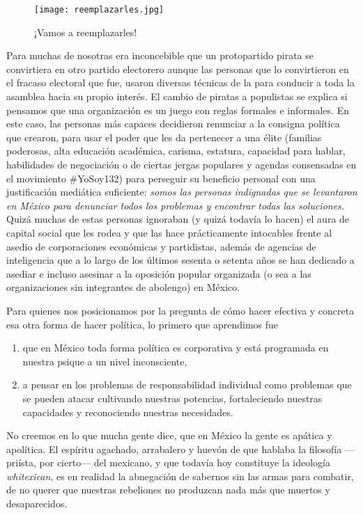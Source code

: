 \begin{figure}[htbp]
	\centering
	\texttt{[image: reemplazarles.jpg]}
	\caption{¡Vamos a reemplazarles!}
	\label{fig:reemplazo}
\end{figure}

Para muchas de nosotras era inconcebible que un protopartido pirata se convirtiera en otro partido electorero aunque las personas que lo convirtieron en el fracaso electoral que fue, usaron diversas técnicas de la  para conducir a toda la asamblea hacia su propio interés. El cambio de piratas a populistas se explica si pensamos que una organización es un juego con reglas formales e informales. En este caso, las personas más capaces decidieron renunciar a la consigna política que crearon, para usar el poder que les da pertenecer a una élite (familias poderosas, alta educación académica, carisma, estatura, capacidad para hablar, habilidades de negociación o de ciertas jergas populares y agendas consensadas en el movimiento \#YoSoy132) para perseguir su beneficio personal con una justificación mediática suficiente: \emph{somos las personas indignadas que se levantaron en México para denunciar todos los problemas y encontrar todas las soluciones.} Quizá muchas de estas personas ignoraban (y quizá todavía lo hacen) el aura de capital social que les rodea y que las hace prácticamente intocables frente al asedio de corporaciones económicas y partidistas, además de agencias de inteligencia que a lo largo de los últimos sesenta o setenta años se han dedicado a asediar e incluso asesinar a la oposición popular organizada (o sea a las organizaciones sin integrantes de abolengo) en México.

Para quienes nos posicionamos por la pregunta de cómo hacer efectiva y concreta esa otra forma de hacer política, lo primero que aprendimos fue 
\begin{enumerate}
	\item que en México toda forma política es corporativa y está programada en nuestra psique a un nivel  inconsciente, 
	\item a pensar en los problemas de responsabilidad individual como problemas que se pueden atacar cultivando nuestras potencias, fortaleciendo nuestras capacidades y reconociendo nuestras necesidades.
\end{enumerate}

No creemos en lo que mucha gente dice, que en México la gente es apática y apolítica. El espíritu agachado, arrabalero y huevón de que hablaba la filosofía ---priísta, por cierto--- del mexicano, y que todavía hoy constituye la ideología \emph{whitexican}, es en realidad la abnegación de sabernos sin las armas para combatir, de no querer que nuestras rebeliones no produzcan nada más que muertos y desaparecidos.

